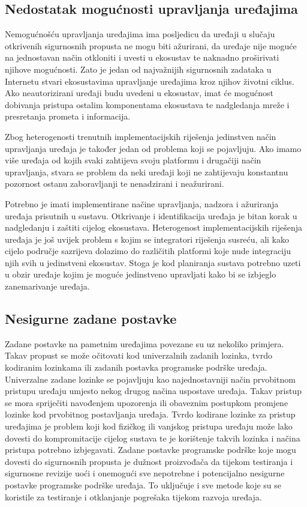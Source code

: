\documentclass[times, utf8, diplomski]{fer}
\begin{document}
\subsection{Nedostatak mogućnosti upravljanja uređajima}
Nemogućnošću upravljanja uređajima ima posljedicu da uređaji u slučaju otkrivenih sigurnosnih propusta ne mogu biti ažurirani, da uređaje nije moguće na jednostavan način otkloniti i uvesti u ekosustav te naknadno proširivati njihove mogućnosti. Zato je jedan od najvažnijih sigurnosnih zadataka u Internetu stvari ekosustavima upravljanje uređajima kroz njihov životni ciklus. Ako neautorizirani uređaji budu uvedeni u ekosustav, imat će mogućnost dobivanja pristupa ostalim komponentama ekosustava te nadgledanja mreže i presretanja prometa i informacija. 

Zbog heterogenosti trenutnih implementacijskih riješenja jedinstven način upravljanja uređaja je također jedan od problema koji se pojavljuju. Ako imamo više uređaja od kojih svaki zahtijeva svoju platformu i drugačiji način upravljanja, stvara se problem da neki uređaji koji ne zahtijevaju konstantnu pozornost ostanu zaboravljanji te nenadzirani i neažurirani. 

Potrebno je imati implementirane načine upravljanja, nadzora i ažuriranja uređaja prisutnih u sustavu. Otkrivanje i identifikacija uređaja je bitan korak u nadgledanju i zaštiti cijelog ekosustava. Heterogenost implementacijskih riješenja uređaja je još uvijek problem s kojim se integratori riješenja susreću, ali kako cijelo područje sazrijeva dolazimo do različitih platformi koje nude integraciju njih svih u jedinstveni ekosustav. Stoga je kod planiranja sustava potrebno uzeti u obzir uređaje kojim je moguće jedinstveno upravljati kako bi se izbjeglo zanemarivanje uređaja.

\subsection{Nesigurne zadane postavke}
Zadane postavke na pametnim uređajima povezane su uz nekoliko primjera. Takav propust se može očitovati kod univerzalnih zadanih lozinka, tvrdo kodiranim lozinkama ili zadanih postavka programske podrške uređaja. Univerzalne zadane lozinke se pojavljuju kao najednostavniji način prvobitnom pristupu uređaju umjesto nekog drugog načina uspostave uređaja. Takav pristup se mora spriječiti navođenjem upozorenja ili obaveznim postupkom promjene lozinke kod prvobitnog postavljanja uređaja. Tvrdo kodirane lozinke za pristup uređajima je problem koji kod fizičkog ili vanjskog pristupa uređaju može lako dovesti do kompromitacije cijelog sustava te je korištenje takvih lozinka i načina pristupa potrebno izbjegavati. Zadane postavke programske podrške koje mogu dovesti do sigurnosnih propusta je dužnost proizvođača da tijekom testiranja i sigurnosne revizije uoći i onemogući sve nepotrebne i potencijalno nesigurne postavke programske podrške uređaja. To uključuje i sve metode koje su se koristile za testiranje i otklanjanje pogrešaka tijekom razvoja uređaja.
\end{document}
